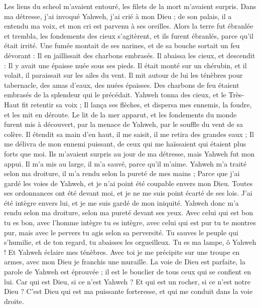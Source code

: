\begin{multicols}{2}
Les liens du scheol m'avaient entouré, les filets de la mort m'avaient surpris.
Dans ma détresse, j'ai invoqué Yahweh, j'ai crié à mon Dieu ; de son palais, il a entendu ma voix, et mon cri est parvenu à ses oreilles.
Alors la terre fut ébranlée et trembla, les fondements des cieux s’agitèrent, et ils furent ébranlés, parce qu'il était irrité.
Une fumée montait de ses narines, et de sa bouche sortait un feu dévorant : Il en jaillissait des charbons embrasés.
Il abaissa les cieux, et descendit : Il y avait une épaisse nuée sous ses pieds.
Il était monté sur un chérubin, et il volait, il paraissait sur les ailes du vent.
Il mit autour de lui les ténèbres pour tabernacle, des amas d'eaux, des nuées épaisses.
Des charbons de feu étaient embrasés de la splendeur qui le précédait.
Yahweh tonna des cieux, et le Très-Haut fit retentir sa voix ;
Il lança ses flèches, et dispersa mes ennemis, la foudre, et les mit en déroute.
Le lit de la mer apparut, et les fondements du monde furent mis à découvert, par la menace de Yahweh, par le souffle du vent de sa colère.
Il étendit sa main d'en haut, il me saisit, il me retira des grandes eaux ;
Il me délivra de mon ennemi puissant, de ceux qui me haïssaient qui étaient plus forts que moi.
Ils m'avaient surpris au jour de ma détresse, mais Yahweh fut mon appui.
Il m'a mis au large, il m'a sauvé, parce qu'il m’aime.
Yahweh m'a traité selon ma droiture, il m'a rendu selon la pureté de mes mains ;
Parce que j'ai gardé les voies de Yahweh, et je n'ai point été coupable envers mon Dieu.
Toutes ses ordonnances ont été devant moi, et je ne me suis point écarté de ses lois.
J'ai été intègre envers lui, et je me suis gardé de mon iniquité.
Yahweh donc m'a rendu selon ma droiture, selon ma pureté devant ses yeux.
Avec celui qui est bon tu es bon, avec l'homme intègre tu es intègre,
avec celui qui est pur tu te montres pur, mais avec le pervers tu agis selon sa perversité.
Tu sauves le peuple qui s’humilie, et de ton regard, tu abaisses les orgueilleux.
Tu es ma lampe, ô Yahweh ! Et Yahweh éclaire mes ténèbres.
Avec toi je me précipite sur une troupe en armes, avec mon Dieu je franchis une muraille.
La voie de Dieu est parfaite, la parole de Yahweh est éprouvée ; il est le bouclier de tous ceux qui se confient en lui.
Car qui est Dieu, si ce n'est Yahweh ? Et qui est un rocher, si ce n'est notre Dieu ?
C'est Dieu qui est ma puissante forteresse, et qui me conduit dans la voie droite.

\end{multicols}

